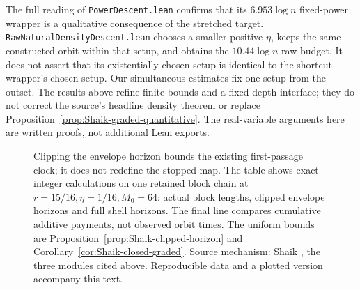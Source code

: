The full reading of \texttt{PowerDescent.lean} confirms that its
\(6.953\log n\) fixed-power wrapper is a qualitative consequence of
the stretched target. \texttt{RawNaturalDensityDescent.lean} chooses
a smaller positive \(\eta\), keeps the same constructed orbit within
that setup, and obtains the \(10.44\log n\) raw budget.
It does not assert that its existentially chosen setup is identical
to the shortcut wrapper's chosen setup. Our simultaneous estimates
fix one setup from the outset.
The results above refine finite bounds and a fixed-depth interface;
they do not correct the source's headline density theorem or replace
Proposition~\ref{prop:Shaik-graded-quantitative}.
The real-variable arguments here are written proofs, not additional
Lean exports.

\begin{figure}[ht]
\centering
{}
\caption{Clipping the envelope horizon bounds the existing first-passage
clock; it does not redefine the stopped map. The table shows exact
integer calculations on one retained block chain at
\(r=15/16,\eta=1/16,M_0=64\): actual block lengths, clipped envelope
horizons and full shell horizons. The final line compares cumulative
additive payments, not observed orbit times. The uniform bounds are
Proposition~\ref{prop:Shaik-clipped-horizon} and
Corollary~\ref{cor:Shaik-closed-graded}. Source mechanism: Shaik
\cite{Shaik2026v324}, the three modules cited above.
Reproducible data and a plotted version accompany this text.}
\end{figure}

